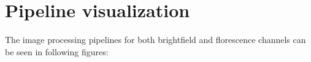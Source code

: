 \documentclass[pdftex,12pt,a4paper]{report}
\begin{document}


\section{Pipeline visualization}

The image processing pipelines for both brightfield and florescence channels can be seen in following figures:

\end{document}
